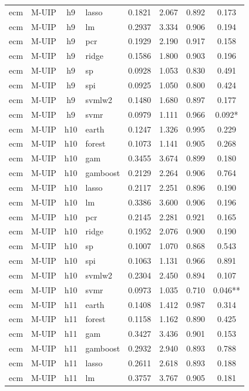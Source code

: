 \begin{ThreePartTable}
\begin{longtable}[t]{llclcccc}
ecm & M-UIP & h9 & lasso & 0.1821 & 2.067 & 0.892 & 0.173\\
ecm & M-UIP & h9 & lm & 0.2937 & 3.334 & 0.906 & 0.194\\
ecm & M-UIP & h9 & pcr & 0.1929 & 2.190 & 0.917 & 0.158\\
ecm & M-UIP & h9 & ridge & 0.1586 & 1.800 & 0.903 & 0.196\\
ecm & M-UIP & h9 & sp & 0.0928 & 1.053 & 0.830 & 0.491\\
ecm & M-UIP & h9 & spi & 0.0925 & 1.050 & 0.800 & 0.424\\
ecm & M-UIP & h9 & svmlw2 & 0.1480 & 1.680 & 0.897 & 0.177\\
ecm & M-UIP & h9 & svmr & 0.0979 & 1.111 & 0.966 & 0.092*\\
\addlinespace
ecm & M-UIP & h10 & earth & 0.1247 & 1.326 & 0.995 & 0.229\\
ecm & M-UIP & h10 & forest & 0.1073 & 1.141 & 0.905 & 0.268\\
ecm & M-UIP & h10 & gam & 0.3455 & 3.674 & 0.899 & 0.180\\
ecm & M-UIP & h10 & gamboost & 0.2129 & 2.264 & 0.906 & 0.764\\
ecm & M-UIP & h10 & lasso & 0.2117 & 2.251 & 0.896 & 0.190\\
ecm & M-UIP & h10 & lm & 0.3386 & 3.600 & 0.906 & 0.196\\
ecm & M-UIP & h10 & pcr & 0.2145 & 2.281 & 0.921 & 0.165\\
ecm & M-UIP & h10 & ridge & 0.1952 & 2.076 & 0.900 & 0.190\\
ecm & M-UIP & h10 & sp & 0.1007 & 1.070 & 0.868 & 0.543\\
ecm & M-UIP & h10 & spi & 0.1063 & 1.131 & 0.966 & 0.891\\
ecm & M-UIP & h10 & svmlw2 & 0.2304 & 2.450 & 0.894 & 0.107\\
ecm & M-UIP & h10 & svmr & 0.0973 & 1.035 & 0.710 & 0.046**\\
\addlinespace
ecm & M-UIP & h11 & earth & 0.1408 & 1.412 & 0.987 & 0.314\\
ecm & M-UIP & h11 & forest & 0.1158 & 1.162 & 0.890 & 0.425\\
ecm & M-UIP & h11 & gam & 0.3427 & 3.436 & 0.901 & 0.153\\
ecm & M-UIP & h11 & gamboost & 0.2932 & 2.940 & 0.893 & 0.788\\
ecm & M-UIP & h11 & lasso & 0.2611 & 2.618 & 0.893 & 0.188\\
ecm & M-UIP & h11 & lm & 0.3757 & 3.767 & 0.905 & 0.181\\

\end{longtable}
\end{ThreePartTable}
